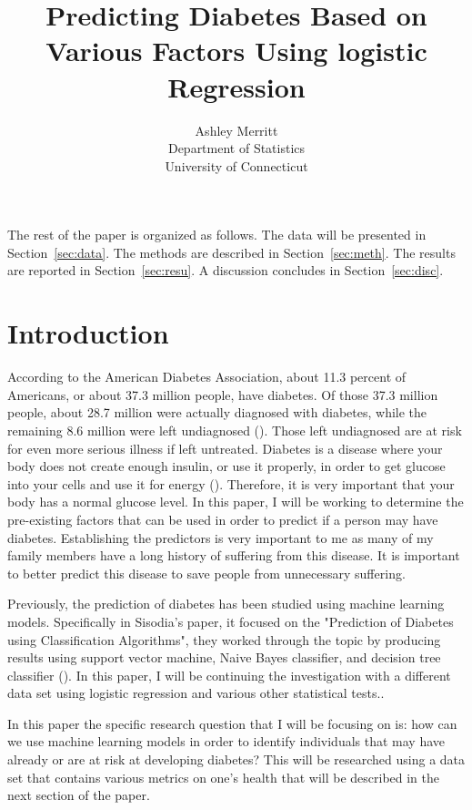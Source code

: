 \documentclass[12pt]{article}
\title{Predicting Diabetes Based on Various Factors Using logistic Regression}
\author{Ashley Merritt\\
    Department of Statistics\\
    University of Connecticut
    }
\begin{document}
\maketitle

\begin{abstract}

\end{abstract}

The rest of the paper is organized as follows.
The data will be presented in Section~\ref{sec:data}.
The methods are described in Section~\ref{sec:meth}.
The results are reported in Section~\ref{sec:resu}.
A discussion concludes in Section~\ref{sec:disc}.

\section{Introduction}
\label{sec:intro}
    According to the American Diabetes Association, about 11.3 percent of Americans, or about 37.3 million people, have diabetes. Of those 37.3 million people, about 28.7 million were actually diagnosed with diabetes, while the remaining 8.6 million were left undiagnosed (\citet{CDC2022Diabetes}). Those left undiagnosed are at risk for even more serious illness if left untreated. Diabetes is a disease where your body does not create enough insulin, or use it properly, in order to get glucose into your cells and use it for energy (\cite{NIH2023Whatis}). Therefore, it is very important that your body has a normal glucose level. In this paper, I will be working to determine the pre-existing factors that can be used in order to predict if a person may have diabetes. Establishing the predictors is very important to me as many of my family members have a long history of suffering from this disease. It is important to better predict this disease to save people from unnecessary suffering. 

    Previously, the prediction of diabetes has been studied using machine learning models. Specifically in Sisodia's paper, it focused on the "Prediction of Diabetes using Classification Algorithms", they worked through the topic by producing results using support vector machine, Naive Bayes classifier, and decision tree classifier (\cite{Sisodia2018Prediction}). In this paper, I will be continuing the investigation with a different data set using logistic regression and various other statistical tests.. 

    In this paper the specific research question that I will be focusing on is: how can we use machine learning models in order to identify individuals that may have already or are at risk at developing diabetes? This will be researched using a data set that contains various metrics on one's health that will be described in the next section of the paper.
\end{document}
